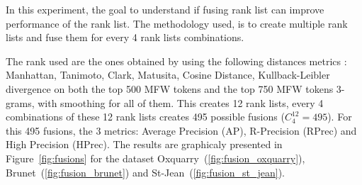 In this experiment, the goal to understand if fusing rank list can improve performance of the rank list.
The methodology used, is to create multiple rank lists and fuse them for every 4 rank lists combinations.

The rank used are the ones obtained by using the following distances metrics : Manhattan, Tanimoto, Clark, Matusita, Cosine Distance, Kullback-Leibler divergence on both the top 500 MFW tokens and the top 750 MFW tokens 3-grams, with smoothing for all of them.
This creates 12 rank lists, every 4 combinations of these 12 rank lists creates 495 possible fusions ($C^{12}_{4} = 495$).
For this 495 fusions, the 3 metrics: Average Precision (AP), R-Precision (RPrec) and High Precision (HPrec).
The results are graphicaly presented in Figure~\ref{fig:fusions} for the dataset Oxquarry~(\ref{fig:fusion_oxquarry}), Brunet~(\ref{fig:fusion_brunet}) and St-Jean~(\ref{fig:fusion_st_jean}).

